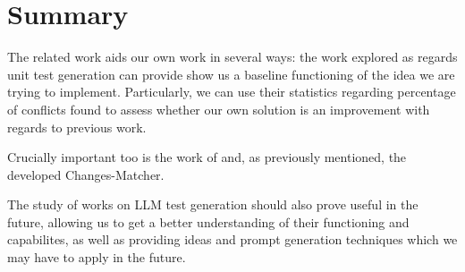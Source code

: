 \section{Summary}

The related work aids our own work in several ways: the work explored as regards unit test generation can provide show us a baseline functioning of the idea we are trying to implement. Particularly, we can use their statistics regarding percentage of conflicts found to assess whether our own solution is an improvement with regards to previous work.

Crucially important too is the work of \citet{kn:nuno} and, as previously mentioned, the developed Changes-Matcher.

The study of works on LLM test generation should also prove useful in the future, allowing us to get a better understanding of their functioning and capabilites, as well as providing ideas and prompt generation techniques which we may have to apply in the future.
